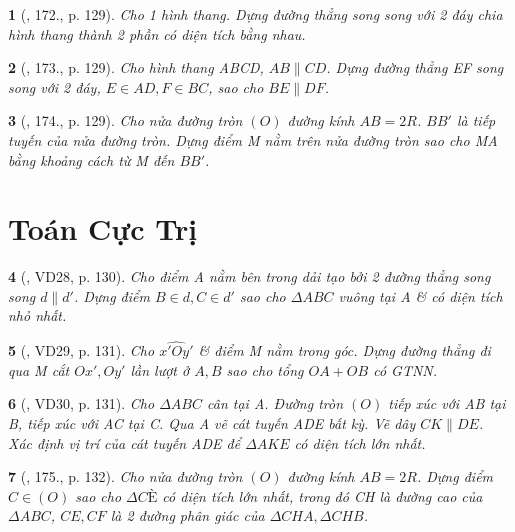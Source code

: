 \documentclass{article}
\newtheorem{baitoan}{}
\begin{document}
\begin{baitoan}[\cite{Binh_Toan_9_tap_1}, 172., p. 129]
	Cho 1 hình thang. Dựng đường thẳng song song với 2 đáy chia hình thang thành 2 phần có diện tích bằng nhau.
\end{baitoan}

\begin{baitoan}[\cite{Binh_Toan_9_tap_1}, 173., p. 129]
	Cho hình thang ABCD, $AB\parallel CD$. Dựng đường thẳng EF song song với 2 đáy, $E\in AD,F\in BC$, sao cho $BE\parallel DF$.
\end{baitoan}

\begin{baitoan}[\cite{Binh_Toan_9_tap_1}, 174., p. 129]
	Cho nửa đường tròn $(O)$ đường kính $AB = 2R$. $BB'$ là tiếp tuyến của nửa đường tròn. Dựng điểm M nằm trên nửa đường tròn sao cho MA bằng khoảng cách từ M đến $BB'$.
\end{baitoan}


\section{Toán Cực Trị}

\begin{baitoan}[\cite{Binh_Toan_9_tap_1}, VD28, p. 130]
	Cho điểm A nằm bên trong dải tạo bởi 2 đường thẳng song song $d\parallel d'$. Dựng điểm $B\in d,C\in d'$ sao cho $\Delta ABC$ vuông tại A \& có diện tích nhỏ nhất.
\end{baitoan}

\begin{baitoan}[\cite{Binh_Toan_9_tap_1}, VD29, p. 131]
	Cho $\widehat{x'Oy'}$ \& điểm M nằm trong góc. Dựng đường thẳng đi qua M cắt $Ox',Oy'$ lần lượt ở $A,B$ sao cho tổng $OA + OB$ có {\rm GTNN}.
\end{baitoan}

\begin{baitoan}[\cite{Binh_Toan_9_tap_1}, VD30, p. 131]
	Cho $\Delta ABC$ cân tại A. Đường tròn $(O)$ tiếp xúc với AB tại B, tiếp xúc với AC tại C. Qua A vẽ cát tuyến ADE bất kỳ. Vẽ dây $CK\parallel DE$. Xác định vị trí của cát tuyến ADE để $\Delta AKE$ có diện tích lớn nhất.
\end{baitoan}

\begin{baitoan}[\cite{Binh_Toan_9_tap_1}, 175., p. 132]
	Cho nửa đường tròn $(O)$ đường kính $AB = 2R$. Dựng điểm $C\in(O)$ sao cho $\Delta CÈ$ có diện tích lớn nhất, trong đó CH là đường cao của $\Delta ABC$, $CE,CF$ là 2 đường phân giác của $\Delta CHA,\Delta CHB$.
\end{baitoan}
\end{document}
